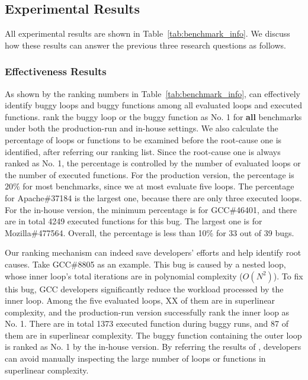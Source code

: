 \subsection{Experimental Results}
\label{sec:results}

All experimental results are shown in Table~\ref{tab:benchmark_info}.
We discuss how these results can answer the previous three research questions as follows.


\subsubsection{Effectiveness Results}
As shown by the ranking numbers in Table~\ref{tab:benchmark_info},
\Tool can effectively identify buggy loops and buggy functions 
among all evaluated loops and executed functions. 
\Tool rank the buggy loop or the buggy function as No. 1 
for \textbf{all} benchmarks under both the production-run and in-house settings. 
We also calculate the percentage of loops or functions 
to be examined before the root-cause one is identified, 
after referring our ranking list. 
Since the root-cause one is always ranked as No. 1,
the percentage is controlled by the number of evaluated loops 
or the number of executed functions. 
For the production version, the percentage is $20\%$ for most benchmarks, 
since we at most evaluate five loops. 
The percentage for Apache\#37184 is the largest one, 
because there are only three executed loops. 
For the in-house version, the minimum percentage is for GCC\#46401, 
and there are in total 4249 executed functions for this bug.
The largest one is for Mozilla\#477564. 
Overall, the percentage is less than 10\% for 33 out of 39 bugs. 

Our ranking mechanism can indeed save developers' efforts 
and help identify root causes. 
Take GCC\#8805 as an example.
This bug is caused by a nested loop, 
whose inner loop's total iterations are in polynomial complexity ($O(N^2)$).
To fix this bug, GCC developers significantly reduce 
the workload processed by the inner loop. 
Among the five evaluated loops, {\color{red} XX} of them are in superlinear complexity, and 
the production-run version successfully rank the inner loop as No. 1.
There are in total 1373 executed function during buggy runs,
and 87 of them are in superlinear complexity. 
The buggy function containing the outer loop is ranked as No. 1 
by the in-house version. 
By referring the results of \Tool, 
developers can avoid manually inspecting the large number of  
loops or functions in superlinear complexity. 


